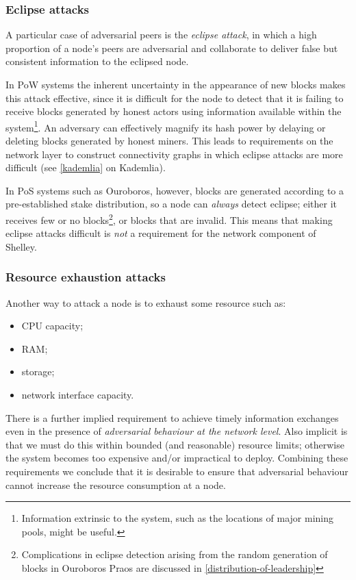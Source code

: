 \documentclass[11pt,a4paper]{article}
\begin{document}
\subsubsection{Eclipse attacks}
\label{eclipse-attacks}

A particular case of adversarial peers is the \emph{eclipse attack},
in which a high proportion of a node's peers are adversarial and
collaborate to deliver false but consistent information to the eclipsed
node.

In PoW systems the inherent uncertainty in the appearance of new blocks
makes this attack effective, since it is difficult for the node to
detect that it is failing to receive blocks generated by honest actors
using information available within the system\footnote{Information
  extrinsic to the system, such as the locations of major mining pools,
  might be useful.}. An adversary can effectively magnify its hash power
by delaying or deleting blocks generated by honest miners. This leads to
requirements on the network layer to construct connectivity graphs in
which eclipse attacks are more difficult (see
\cref{kademlia} on Kademlia).

In PoS systems such as Ouroboros, however, blocks are generated
according to a pre-established stake distribution, so a node can
\emph{always} detect eclipse; either it receives few or no
blocks\footnote{Complications in eclipse detection arising from the
  random generation of blocks in Ouroboros Praos are discussed in
  \cref{distribution-of-leadership}}, or
blocks that are invalid. This means that making eclipse attacks
difficult is \emph{not} a requirement for the network component of
Shelley.

\subsubsection{Resource exhaustion attacks}
\label{resource-exhaustion-attacks}

Another way to attack a node is to exhaust some resource such as:

\begin{itemize}
\item
  CPU capacity;
\item
  RAM;
\item
  storage;
\item
  network interface capacity.
\end{itemize}

There is a further implied requirement to achieve timely information
exchanges even in the presence of \emph{adversarial behaviour at the
network level}. Also implicit is that we must do this within bounded
(and reasonable) resource limits; otherwise the system becomes too
expensive and/or impractical to deploy. Combining these requirements we
conclude that it is desirable to ensure that adversarial behaviour
cannot increase the resource consumption at a node.
\end{document}
